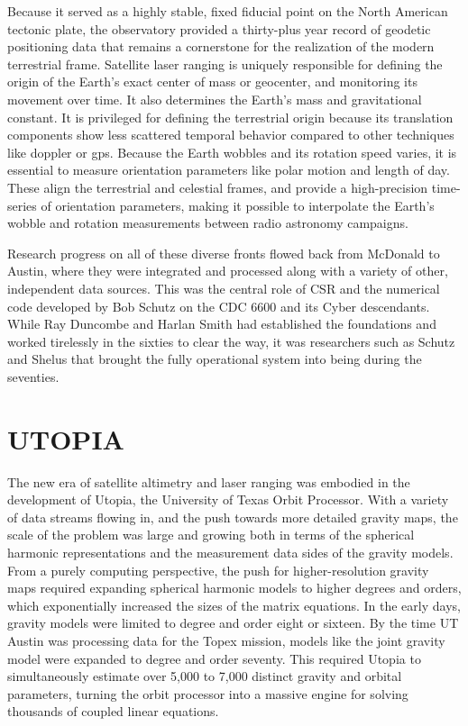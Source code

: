 Because it served as a highly stable, fixed fiducial point on the North American tectonic plate, the observatory provided a thirty-plus year record of geodetic positioning data that remains a cornerstone for the realization of the modern terrestrial frame. Satellite laser ranging is uniquely responsible for defining the origin of the Earth's exact center of mass or geocenter, and monitoring its movement over time. It also determines the Earth's mass and gravitational constant. It is privileged for defining the terrestrial origin because its translation components show less scattered temporal behavior compared to other techniques like doppler or gps. Because the Earth wobbles and its rotation speed varies, it is essential to measure orientation parameters like polar motion and length of day. These align the terrestrial and celestial frames, and provide a high-precision time-series of orientation parameters, making it possible to interpolate the Earth's wobble and rotation measurements between radio astronomy campaigns.

Research progress on all of these diverse fronts flowed back from McDonald to Austin, where they were integrated and processed along with a variety of other, independent data sources. This was the central role of CSR and the numerical code developed by Bob Schutz on the CDC 6600 and its Cyber descendants. While Ray Duncombe and Harlan Smith had established the foundations and worked tirelessly in the sixties to clear the way, it was researchers such as Schutz and Shelus that brought the fully operational system into being during the seventies.

\section{UTOPIA}

The new era of satellite altimetry and laser ranging was embodied in the development of Utopia, the University of Texas Orbit Processor. With a variety of data streams flowing in, and the push towards more detailed gravity maps, the scale of the problem was large and growing both in terms of the spherical harmonic representations and the measurement data sides of the gravity models. From a purely computing perspective, the push for higher-resolution gravity maps required expanding spherical harmonic models to higher degrees and orders, which exponentially increased the sizes of the matrix equations. In the early days, gravity models were limited to degree and order eight or sixteen. By the time UT Austin was processing data for the Topex mission, models like the joint gravity model were expanded to degree and order seventy. This required Utopia to simultaneously estimate over 5,000 to 7,000 distinct gravity and orbital parameters, turning the orbit processor into a massive engine for solving thousands of coupled linear equations.

